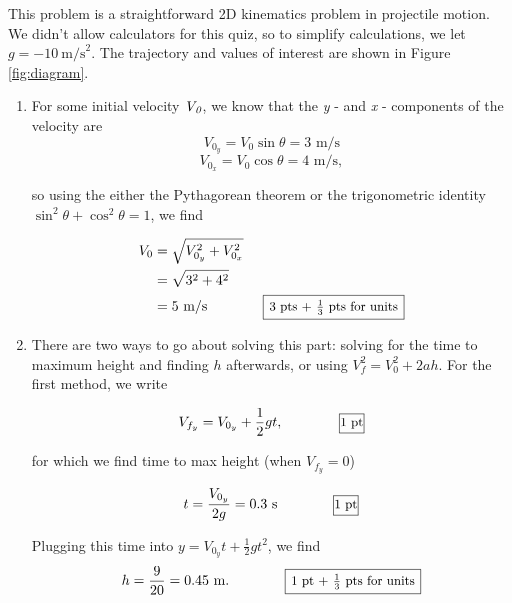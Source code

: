 \documentclass{article}[12pt]
\begin{document}
\begin{large}

\noindent This problem is a straightforward 2D kinematics problem in projectile motion. We didn't allow calculators for this quiz,
so to simplify calculations, we let $g = -10 \ \text{m/s}^2$. The trajectory and values of interest are shown in Figure \ref{fig:diagram}.

\begin{enumerate}

\item For some initial velocity $\text{{\it V}}_{\text{{\it 0}}}$, we know that the {\it y} - and {\it x} - components of the velocity are 
$$ V_{0_y} = V_0 \sin \theta = \text{3 m/s}$$
$$ V_{0_x} = V_0 \cos \theta = \text{4 m/s},$$

so using the either the Pythagorean theorem or the trigonometric identity $\sin^2 \theta + \cos^2 \theta = 1$, we find

\begin{align*} V_0 &= \sqrt{V_{0_y}^2 + V_{0_x}^2} \\
&= \sqrt{3^2 + 4^2} \\
&= 5 \ \text{m/s}  \qquad \qquad \begin{small} \framebox[1.1\width]{3 pts + $\frac{1}{3}$ pts for units} \end{small}
\end{align*}

\item \label{part2} There are two ways to go about solving this part: solving for the time to maximum height and finding $h$ afterwards, or using
$V_f^2 = V_0^2 + 2ah$. For the first method, we write

$$ V_{f_y} = V_{0_y} + \frac{1}{2} g t, \qquad \qquad \begin{small} \framebox[1.1\width]{1 pt} \end{small}$$

for which we find time to max height (when $V_{f_y} = 0$)

$$ t = \frac{V_{0_y}}{2g} = 0.3 \ \text{s} \qquad \qquad \begin{small} \framebox[1.1\width]{1 pt} \end{small}$$

Plugging this time into $y = V_{0_y} t + \frac{1}{2} g t^2$, we find 
$$ h = \frac{9}{20} = 0.45 \ \text{m}. \qquad \qquad \begin{small} \framebox[1.1\width]{1 pt + $\frac{1}{3}$ pts for units} \end{small} $$


\end{enumerate}
\end{large}
\end{document}
